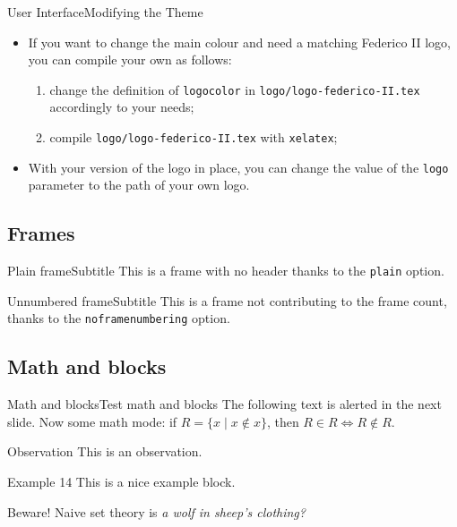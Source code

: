 \documentclass[10pt,aspectratio=43
	]{beamer}
\begin{document}
\begin{frame}{User Interface}{Modifying the Theme}
	\begin{itemize}[<+->]
		\item If you want to change the main colour and need a matching Federico II logo,
		  	you can compile your own as follows:
		  	\begin{enumerate}[<+->]
				\item change the definition of \texttt{logocolor} in 
					\texttt{logo/logo-federico-II.tex} accordingly to your needs;
				\item compile \texttt{logo/logo-federico-II.tex} with \texttt{xelatex};
			\end{enumerate}
		\item With your version of the logo in place, you can change the value of the \texttt{logo}
			parameter to the path of your own logo.
	\end{itemize}
\end{frame}

\subsection{Frames}

\begin{frame}[plain]{Plain frame}{Subtitle}
	This is a frame with no header thanks to the \texttt{plain} option.
\end{frame}

\begin{frame}[noframenumbering]{Unnumbered frame}{Subtitle}
	This is a frame not contributing to the frame count, thanks to the \texttt{noframenumbering} option.
\end{frame}

\subsection{Math and blocks}

\begin{frame}{Math and blocks}{Test math and blocks}
	The following text is \alert<2>{alerted} in the next slide. 
	Now some math mode:
	if $R=\{x\mid x\not\in x\}$, then $R\in R \Leftrightarrow R\not\in R$.
	\begin{block}{Observation}
	This is an observation.
	\end{block}
	\begin{exampleblock}{Example 14}
	This is a nice example block.
	\end{exampleblock}
	\begin{alertblock}{Beware!}
	Naive set theory is \emph{a wolf in sheep's clothing?}
	\end{alertblock}
\end{frame}
\end{document}
